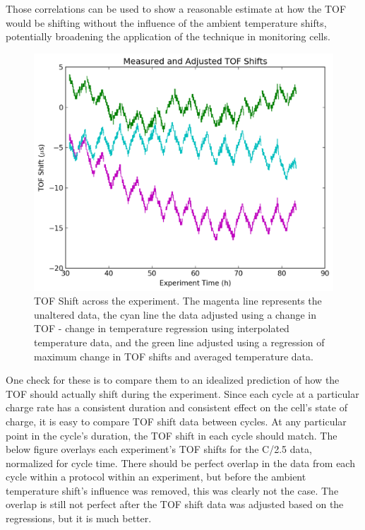 Those correlations can be used to show a reasonable estimate at how the TOF would be shifting without the influence of the ambient temperature shifts, potentially broadening the application of the technique in monitoring cells.
\begin{figure}[t]\label{fig:0417tofshiftadj}
\includegraphics[width=\textwidth]{Thesis/0417tofshiftadj.png}
\centering
\caption{TOF Shift across the experiment. The magenta line represents the unaltered data, the cyan line the data adjusted using a change in TOF - change in temperature regression using interpolated temperature data, and the green line adjusted using a regression of maximum change in TOF shifts and averaged temperature data.}
\end{figure}

One check for these is to compare them to an idealized prediction of how the TOF should actually shift during the experiment. Since each cycle at a particular charge rate has a consistent duration and consistent effect on the cell's state of charge, it is easy to compare TOF shift data between cycles. At any particular point in the cycle's duration, the TOF shift in each cycle should match. The below figure overlays each experiment's TOF shifts for the C/2.5 data, normalized for cycle time. There should be perfect overlap in the data from each cycle within a protocol within an experiment, but before the ambient temperature shift's influence was removed, this was clearly not the case. The overlap is still not perfect after the TOF shift data was adjusted based on the regressions, but it is much better.

